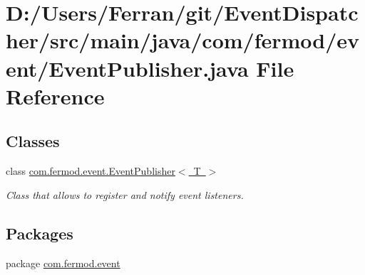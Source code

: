 \hypertarget{a00002}{}\section{D\+:/\+Users/\+Ferran/git/\+Event\+Dispatcher/src/main/java/com/fermod/event/\+Event\+Publisher.java File Reference}
\label{a00002}
\subsection*{Classes}
\begin{DoxyCompactItemize}
\item 
class \mbox{\hyperlink{a00022}{com.\+fermod.\+event.\+Event\+Publisher$<$ T $>$}}
\begin{DoxyCompactList}\small\item\em Class that allows to register and notify event listeners. \end{DoxyCompactList}\end{DoxyCompactItemize}
\subsection*{Packages}
\begin{DoxyCompactItemize}
\item 
package \mbox{\hyperlink{a00014}{com.\+fermod.\+event}}
\end{DoxyCompactItemize}
